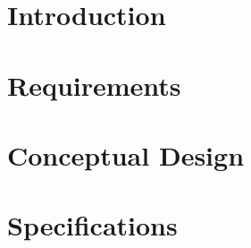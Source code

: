 \documentclass[12pt]{report}
\begin{document}
\normalem

{\tableofcontents\let\clearpage\relax\listoffigures\let\clearpage\relax\listoftables}
\clearpage
\newpage



\section{Introduction}
\section{Requirements}
\section{Conceptual Design}
\section{Specifications}
\newpage
\end{document}
